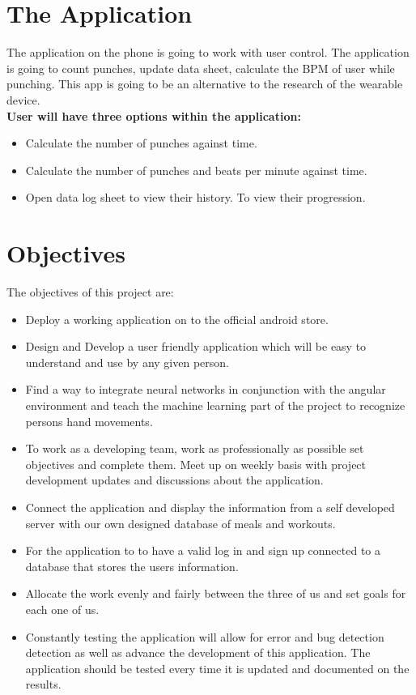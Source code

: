 \documentclass[a4paper,12pt]{report}
\begin{document}
\section{The Application}
The application on the phone is going to work with user control. The application is going to count punches, update data sheet, calculate the BPM of user while punching. This app is going to be an alternative to the research of the wearable device.
\\
\textbf{User will have three options within the application:}
\begin{itemize}
\item Calculate the number of punches against time.
\item Calculate the number of punches and beats per minute against time.
\item Open data log sheet to view their history. To view their progression.
\end{itemize}

\section{Objectives}
The objectives of this project are:
\begin{itemize}

\item Deploy a working application on to the official android store.
\item Design and Develop a user friendly application which will be easy to understand and use by any given person.
\item Find a way to integrate neural networks in conjunction with the angular environment and teach the machine learning part of the project to recognize persons hand movements.
\item To work as a developing team, work as professionally as possible set objectives and complete them. Meet up on weekly basis with project development updates and discussions about the application. 
\item Connect the application and display the information from a self developed server with our own designed database of meals and workouts.
\item For the application to to have a valid log in and sign up connected to a database that stores the users information.
\item Allocate the work evenly and fairly between the three of us and set goals for each one of us.
\item Constantly testing the application will allow for error and bug detection detection as well as advance the development of this application. The application should be tested every time it is updated and documented on the results.  
\end{itemize}
\end{document}
